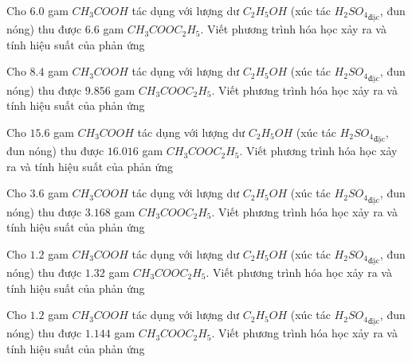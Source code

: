 \begin{bt}
Cho $6.0$ gam $CH_3COOH$ tác dụng với lượng dư $C_2H_5OH$ (xúc tác ${H_2SO_4}_{\text{đặc}}$, đun nóng) thu được $6.6$ gam $CH_3COOC_2H_5$. Viết phương trình hóa học xảy ra và tính hiệu suất của phản ứng
\end{bt}

\begin{bt}
Cho $8.4$ gam $CH_3COOH$ tác dụng với lượng dư $C_2H_5OH$ (xúc tác ${H_2SO_4}_{\text{đặc}}$, đun nóng) thu được $9.856$ gam $CH_3COOC_2H_5$. Viết phương trình hóa học xảy ra và tính hiệu suất của phản ứng
\end{bt}

\begin{bt}
Cho $15.6$ gam $CH_3COOH$ tác dụng với lượng dư $C_2H_5OH$ (xúc tác ${H_2SO_4}_{\text{đặc}}$, đun nóng) thu được $16.016$ gam $CH_3COOC_2H_5$. Viết phương trình hóa học xảy ra và tính hiệu suất của phản ứng
\end{bt}

\begin{bt}
Cho $3.6$ gam $CH_3COOH$ tác dụng với lượng dư $C_2H_5OH$ (xúc tác ${H_2SO_4}_{\text{đặc}}$, đun nóng) thu được $3.168$ gam $CH_3COOC_2H_5$. Viết phương trình hóa học xảy ra và tính hiệu suất của phản ứng
\end{bt}

\begin{bt}
Cho $1.2$ gam $CH_3COOH$ tác dụng với lượng dư $C_2H_5OH$ (xúc tác ${H_2SO_4}_{\text{đặc}}$, đun nóng) thu được $1.32$ gam $CH_3COOC_2H_5$. Viết phương trình hóa học xảy ra và tính hiệu suất của phản ứng
\end{bt}

\begin{bt}
Cho $1.2$ gam $CH_3COOH$ tác dụng với lượng dư $C_2H_5OH$ (xúc tác ${H_2SO_4}_{\text{đặc}}$, đun nóng) thu được $1.144$ gam $CH_3COOC_2H_5$. Viết phương trình hóa học xảy ra và tính hiệu suất của phản ứng
\end{bt}

